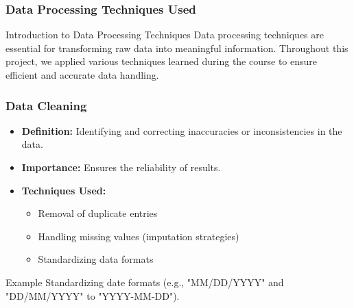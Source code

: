 \documentclass[aspectratio=169]{beamer}
\begin{document}
\begin{frame}[fragile]
    \frametitle{Data Processing Techniques Used}
    \begin{block}{Introduction to Data Processing Techniques}
        Data processing techniques are essential for transforming raw data into meaningful information. Throughout this project, we applied various techniques learned during the course to ensure efficient and accurate data handling.
    \end{block}
\end{frame}

\begin{frame}[fragile]
    \frametitle{Data Cleaning}
    \begin{itemize}
        \item \textbf{Definition:} Identifying and correcting inaccuracies or inconsistencies in the data.
        \item \textbf{Importance:} Ensures the reliability of results.
        \item \textbf{Techniques Used:}
        \begin{itemize}
            \item Removal of duplicate entries
            \item Handling missing values (imputation strategies)
            \item Standardizing data formats
        \end{itemize}
    \end{itemize}
    \begin{block}{Example}
        Standardizing date formats (e.g., "MM/DD/YYYY" and "DD/MM/YYYY" to "YYYY-MM-DD").
    \end{block}
\end{frame}
\end{document}
